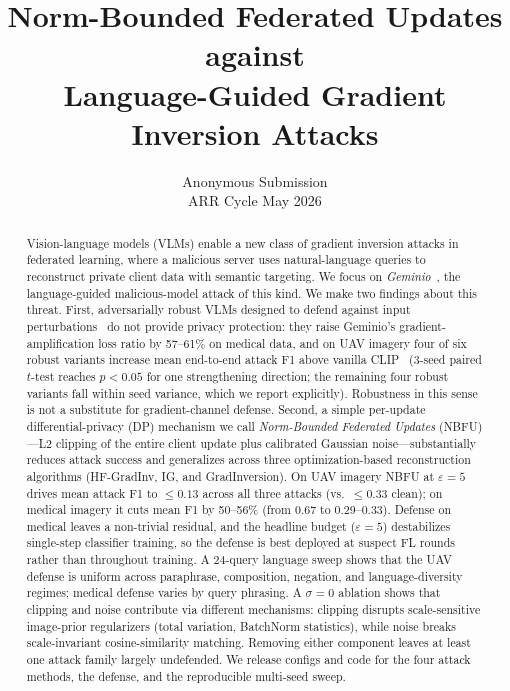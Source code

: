\documentclass[11pt]{article}
\title{Norm-Bounded Federated Updates against\\ Language-Guided Gradient Inversion Attacks}
\author{Anonymous Submission \\ ARR Cycle May 2026}
\begin{document}
\maketitle

\begin{abstract}
Vision-language models (VLMs) enable a new class of gradient inversion attacks in federated learning, where a malicious server uses natural-language queries to reconstruct private client data with semantic targeting. We focus on \emph{Geminio}~\citep{geminio2024}, the language-guided malicious-model attack of this kind. We make two findings about this threat. First, adversarially robust VLMs designed to defend against input perturbations~\citep{fare2024,simclip2024,tecoa2023} do not provide privacy protection: they raise Geminio's gradient-amplification loss ratio by 57--61\% on medical data, and on UAV imagery four of six robust variants increase mean end-to-end attack F1 above vanilla CLIP~\citep{clip2021} (3-seed paired $t$-test reaches $p\!<\!0.05$ for one strengthening direction; the remaining four robust variants fall within seed variance, which we report explicitly). Robustness in this sense is not a substitute for gradient-channel defense. Second, a simple per-update differential-privacy (DP) mechanism we call \emph{Norm-Bounded Federated Updates} (NBFU)---L2 clipping of the entire client update plus calibrated Gaussian noise---substantially reduces attack success and generalizes across three optimization-based reconstruction algorithms (HF-GradInv, IG, and GradInversion). On UAV imagery NBFU at $\varepsilon{=}5$ drives mean attack F1 to $\le 0.13$ across all three attacks (vs.\ $\le 0.33$ clean); on medical imagery it cuts mean F1 by 50--56\% (from 0.67 to 0.29--0.33). Defense on medical leaves a non-trivial residual, and the headline budget ($\varepsilon{=}5$) destabilizes single-step classifier training, so the defense is best deployed at suspect FL rounds rather than throughout training. A 24-query language sweep shows that the UAV defense is uniform across paraphrase, composition, negation, and language-diversity regimes; medical defense varies by query phrasing. A $\sigma{=}0$ ablation shows that clipping and noise contribute via different mechanisms: clipping disrupts scale-sensitive image-prior regularizers (total variation, BatchNorm statistics), while noise breaks scale-invariant cosine-similarity matching. Removing either component leaves at least one attack family largely undefended. We release configs and code for the four attack methods, the defense, and the reproducible multi-seed sweep.
\end{abstract}
\end{document}

